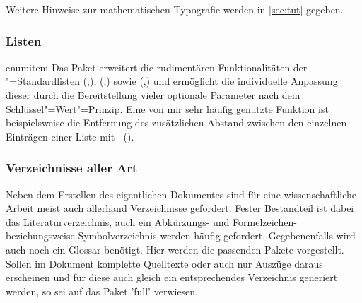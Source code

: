 %
Weitere Hinweise zur mathematischen Typografie werden in \autoref{sec:tut} 
gegeben.
%


\subsubsection{Listen}
%
%
\begin{packages}
\item[enumitem]
  Das Paket  erweitert die rudimentären Funktionalitäten der 
  "=Standardlisten
  (,),
  (,) sowie
  (,) und
  ermöglicht die individuelle Anpassung dieser durch die Bereitstellung vieler 
  optionale Parameter nach dem Schlüssel"=Wert"=Prinzip. Eine von mir sehr 
  häufig genutzte Funktion ist beispielsweise die Entfernung des zusätzlichen 
  Abstand zwischen den einzelnen Einträgen einer Liste mit 
  []().
\end{packages}
%


\subsubsection{Verzeichnisse aller Art}
%
%
Neben dem Erstellen des eigentlichen Dokumentes sind für eine wissenschaftliche 
Arbeit meist auch allerhand Verzeichnisse gefordert. Fester Bestandteil ist 
dabei das Literaturverzeichnis, auch ein Abkürzungs- und Formelzeichen- 
beziehungsweise Symbolverzeichnis werden häufig gefordert. Gegebenenfalls wird 
auch noch ein Glossar benötigt. Hier werden die passenden Pakete vorgestellt. 
Sollen im Dokument komplette Quelltexte oder auch nur Auszüge daraus erscheinen 
und für diese auch gleich ein entsprechendes Verzeichnis generiert werden, so 
sei auf das Paket 'full' verwiesen.

